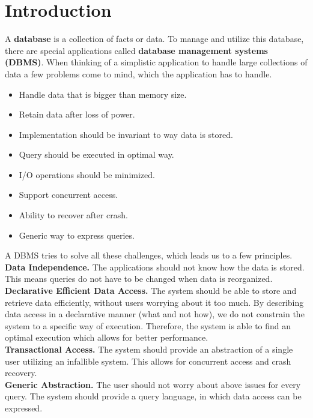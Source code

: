 \section{Introduction}
A \textbf{database} is a collection of facts or data. To manage and utilize this database, there are special applications called \textbf{database management systems (DBMS)}. When thinking of a simplistic application to handle large collections of data a few problems come to mind, which the application has to handle. 
\begin{itemize}
\item Handle data that is bigger than memory size.
\item Retain data after loss of power.
\item Implementation should be invariant to way data is stored.
\item Query should be executed in optimal way.
\item I/O operations should be minimized.
\item Support concurrent access.
\item Ability to recover after crash.
\item Generic way to express queries.
\end{itemize}
A DBMS tries to solve all these challenges, which leads us to a few principles.\\
\textbf{Data Independence.} The applications should not know how the data is stored. This means queries do not have to be changed when data is reorganized.\\
\textbf{Declarative Efficient Data Access.} The system should be able to store and retrieve data efficiently, without users worrying about it too much. By describing data access in a declarative manner (what and not how), we do not constrain the system to a specific way of execution. Therefore, the system is able to find an optimal execution which allows for better performance. \\
\textbf{Transactional Access.} The system should provide an abstraction of a single user utilizing an infallible system. This allows for concurrent access and crash recovery. \\
\textbf{Generic Abstraction.} The user should not worry about above issues for every query. The system should provide a query language, in which data access can be expressed.


